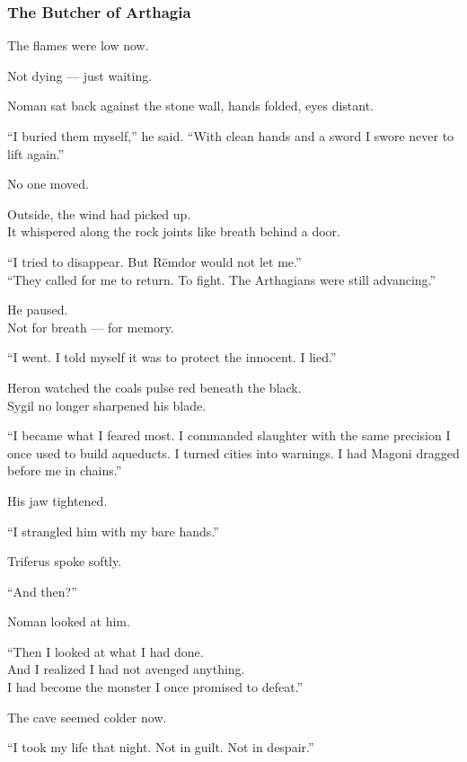 \documentclass[12pt]{article}
\begin{document}
\dotfill

\subsubsection{The Butcher of Arthagia}

The flames were low now.

Not dying — just waiting.

Noman sat back against the stone wall, hands folded, eyes distant.

“I buried them myself,” he said. “With clean hands and a sword I swore never to lift again.”

No one moved.

Outside, the wind had picked up.\\
It whispered along the rock joints like breath behind a door.

“I tried to disappear. But Rēmdor would not let me.”\\
“They called for me to return. To fight. The Arthagians were still advancing.”

He paused.\\
Not for breath — for memory.

“I went. I told myself it was to protect the innocent. I lied.”

\vspace{1em}

Heron watched the coals pulse red beneath the black.\\
Sygil no longer sharpened his blade.

“I became what I feared most. I commanded slaughter with the same precision I once used to build aqueducts. I turned cities into warnings. I had Magoni dragged before me in chains.”

His jaw tightened.

“I strangled him with my bare hands.”

\vspace{1em}

Triferus spoke softly.

“And then?”

Noman looked at him.

“Then I looked at what I had done.\\
And I realized I had not avenged anything.\\
I had become the monster I once promised to defeat.”

The cave seemed colder now.

“I took my life that night. Not in guilt. Not in despair.”
\end{document}
